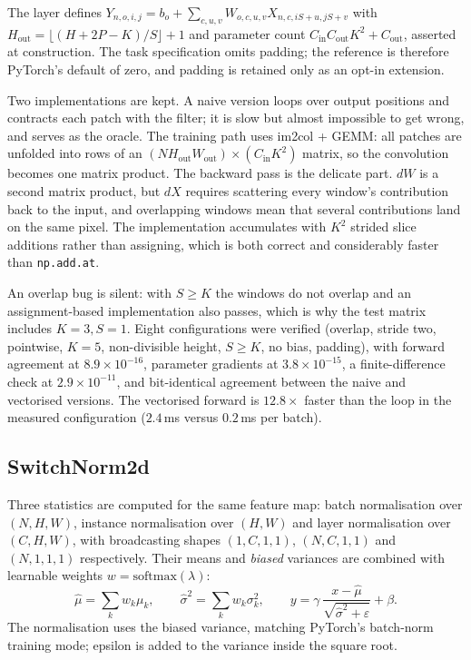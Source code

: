 The layer defines
$Y_{n,o,i,j}=b_o+\sum_{c,u,v}W_{o,c,u,v}X_{n,c,iS+u,jS+v}$ with
$H_{\text{out}}=\lfloor(H+2P-K)/S\rfloor+1$ and parameter count $C_{\text{in}}C_{\text{out}}K^2+C_{\text{out}}$,
asserted at construction. The task specification omits padding; the reference is therefore PyTorch's
default of zero, and padding is retained only as an opt-in extension.

Two implementations are kept. A naive version loops over output positions and contracts each patch
with the filter; it is slow but almost impossible to get wrong, and serves as the oracle. The
training path uses im2col + GEMM: all patches are unfolded into rows of an
$(N H_{\text{out}}W_{\text{out}})\times(C_{\text{in}}K^2)$ matrix, so the convolution becomes one
matrix product. The backward pass is the delicate part. $dW$ is a second matrix product, but $dX$
requires scattering every window's contribution back to the input, and overlapping windows mean that
several contributions land on the same pixel. The implementation accumulates with $K^2$ strided slice
additions rather than assigning, which is both correct and considerably faster than
\texttt{np.add.at}.

An overlap bug is silent: with $S\ge K$ the windows do not overlap and an assignment-based
implementation also passes, which is why the test matrix includes $K=3,S=1$. Eight configurations
were verified (overlap, stride two, pointwise, $K=5$, non-divisible height, $S\ge K$, no bias,
padding), with forward agreement at $8.9\times10^{-16}$, parameter gradients at
$3.8\times10^{-15}$, a finite-difference check at $2.9\times10^{-11}$, and bit-identical agreement
between the naive and vectorised versions. The vectorised forward is $12.8\times$ faster than the
loop in the measured configuration ($2.4$\,ms versus $0.2$\,ms per batch).

\subsection{SwitchNorm2d}

Three statistics are computed for the same feature map: batch normalisation over $(N,H,W)$,
instance normalisation over $(H,W)$ and layer normalisation over $(C,H,W)$, with broadcasting shapes
$(1,C,1,1)$, $(N,C,1,1)$ and $(N,1,1,1)$ respectively. Their means and \emph{biased} variances are
combined with learnable weights $w=\mathrm{softmax}(\lambda)$:
\begin{equation}
\hat\mu=\sum_k w_k\mu_k,\qquad \hat\sigma^2=\sum_k w_k\sigma_k^2,\qquad
y=\gamma\,\frac{x-\hat\mu}{\sqrt{\hat\sigma^2+\varepsilon}}+\beta .
\end{equation}
The normalisation uses the biased variance, matching PyTorch's batch-norm training mode; epsilon is
added to the variance inside the square root.


